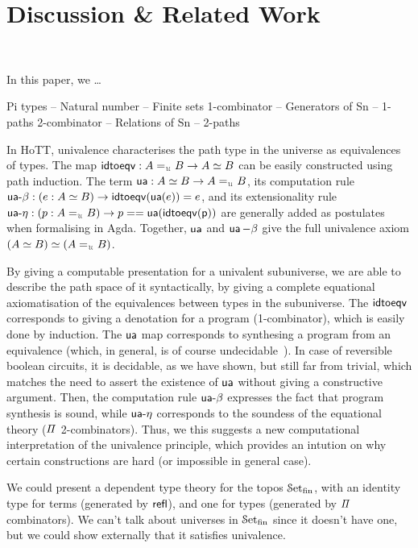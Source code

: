 \section{Discussion \& Related Work}~\label{sec:discussion}

In this paper, we \ldots


Pi types -- Natural number -- Finite sets
1-combinator -- Generators of Sn -- 1-paths
2-combinator -- Relations of Sn -- 2-paths

In HoTT, univalence characterises the path type in the universe as equivalences of types. The map $\term{idtoeqv} : A
\id_{\UU} B \to A \eqv B$ can be easily constructed using path induction. The term $\term{ua} : A \eqv B \to A \id_{\UU}
B$, its computation rule $\term{ua-\beta} : (e : A \eqv B) \to \term{idtoeqv}(\term{ua}(e)) \id e$, and its
extensionality rule $\term{ua-\eta} : (p : A \id_{\UU} B) \to p == \term{ua}(\term{idtoeqv(p)})$ are generally added as
postulates when formalising in Agda. Together, $\operatorname{\mathsf{ua}}$ and $\operatorname{\mathsf{ua}}-\beta$ give the full univalence axiom $(A \eqv
B) \eqv (A \id_{\UU} B)$.


By giving a computable presentation for a univalent subuniverse, we are able to describe the path space of it
syntactically, by giving a complete equational axiomatisation of the equivalences between types in the subuniverse. 
The $\operatorname{\mathsf{idtoeqv}}$ corresponds to giving a denotation for a program (1-combinator), which is easily done by induction.
The $\operatorname{\mathsf{ua}}$ map corresponds to synthesing a program from an equivalence (which, in general, is of course
undecidable~\cite{krogmeierDecidableSynthesisPrograms2020}). In case of reversible boolean circuits, it is decidable, as
we have shown, but still far from trivial, which matches the need to assert the existence of $\operatorname{\mathsf{ua}}$ without giving
a constructive argument. Then, the computation rule $\operatorname{\mathsf{ua-\beta}}$ expresses the fact that program synthesis is
sound, while $\operatorname{\mathsf{ua-\eta}}$ corresponds to the soundess of the equational theory ($\mathit{\Pi}$ 2-combinators). Thus, we
this suggests a new computational interpretation of the univalence principle, which provides an intution on why certain
constructions are hard (or impossible in general case).

We could present a dependent type theory for the topos $\SetFin$, with an identity type for terms (generated by
$\refl$), and one for types (generated by $\mathit{\Pi}$ combinators). We can't talk about universes in $\SetFin$ since it
doesn't have one, but we could show externally that it satisfies univalence.

